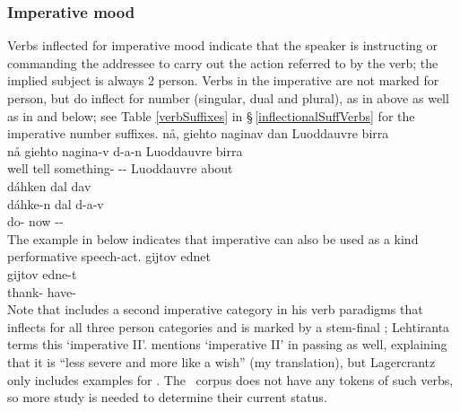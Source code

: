 \subsubsection{Imperative mood}\label{IMPmood}
Verbs inflected for imperative mood indicate that the speaker is instructing or commanding the addressee to carry out the action referred to by the verb; the implied subject is always 2 person. Verbs in the imperative are not marked for person, but do inflect for number (singular, dual and plural), as in  above as well as in  and  below; see Table \vref{verbSuffixes} in §\,\ref{inflectionalSuffVerbs} for the imperative number suffixes. %
\ea\label{imperativeEx1}%
\glll	nå, giehto naginav dan Luoddauvre birra\\
	nå giehto nagina-v d-a-n Luoddauvre birra\\
	well tell\BS{} something- -- Luoddauvre\BS{} about\\\nopagebreak
{}	
\z
\ea\label{imperativeEx2}%
\glll	dáhken dal dav\\
	dáhke-n dal d-a-v\\
	do- now --\\\nopagebreak
{}	
\z
The example in  below indicates that imperative can also be used as a kind performative speech-act. 
\ea\label{imperativeEx3}%
\glll	gijtov ednet\\
	gijtov edne-t\\
	thank- have-\\\nopagebreak
{}	
\z
Note that \citet[150-155]{Lehtiranta1992} includes  a second imperative category in his verb paradigms that inflects for all three person categories and is marked by a stem-final ; Lehtiranta terms this ‘imperative II’. \citet[22]{Lagercrantz1926} mentions ‘imperative II’ in passing as well, explaining that it is “less severe and more like a wish” (my translation), but  Lagercrantz only includes examples for \SGs. %
The \PSDP\ corpus does not have any tokens of such verbs, so more study is needed to determine their current status. 



